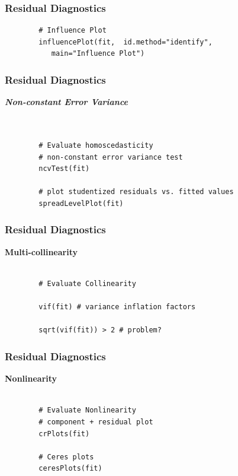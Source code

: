 \documentclass{beamer}
\begin{document}
\begin{frame}[fragile]
	\frametitle{Residual Diagnostics}
	\large
	\begin{framed}
		\begin{verbatim}		
		# Influence Plot 
		influencePlot(fit,	id.method="identify", 
		   main="Influence Plot")
		\end{verbatim}
	\end{framed}
\end{frame}
\begin{frame}[fragile]
	\frametitle{Residual Diagnostics}
	\large
	\textbf{\textit{Non-constant Error Variance}}
	\begin{framed}
		\begin{verbatim}
		

		# Evaluate homoscedasticity
		# non-constant error variance test
		ncvTest(fit)
		
		# plot studentized residuals vs. fitted values 
		spreadLevelPlot(fit)
		\end{verbatim}
	\end{framed}
\end{frame}
\begin{frame}[fragile]
	\frametitle{Residual Diagnostics}
	\large
	\noindent \textbf{Multi-collinearity}
	\begin{framed}
		\begin{verbatim}

		# Evaluate Collinearity
		
		vif(fit) # variance inflation factors 
		
		sqrt(vif(fit)) > 2 # problem?
		\end{verbatim}
	\end{framed}
\end{frame}
\begin{frame}[fragile]
	\frametitle{Residual Diagnostics}
	\large
	\noindent \textbf{Nonlinearity}
	\begin{framed}
		\begin{verbatim}
		
		# Evaluate Nonlinearity
		# component + residual plot 
		crPlots(fit)
		
		# Ceres plots 
		ceresPlots(fit)
		\end{verbatim}
	\end{framed}
\end{frame}
\end{document}
